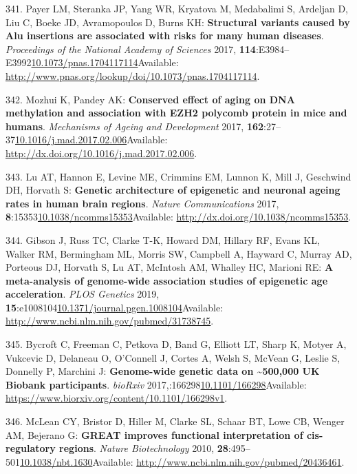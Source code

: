\documentclass[
]{book}
\begin{document}
\leavevmode\hypertarget{ref-Payer2017}{}%
341. Payer LM, Steranka JP, Yang WR, Kryatova M, Medabalimi S, Ardeljan D, Liu C, Boeke JD, Avramopoulos D, Burns KH: \textbf{Structural variants caused by Alu insertions are associated with risks for many human diseases}. \emph{Proceedings of the National Academy of Sciences} 2017, \textbf{114}:E3984--E3992\href{https://doi.org/10.1073/pnas.1704117114}{10.1073/pnas.1704117114}Available: \url{http://www.pnas.org/lookup/doi/10.1073/pnas.1704117114}.

\leavevmode\hypertarget{ref-Mozhui2017}{}%
342. Mozhui K, Pandey AK: \textbf{Conserved effect of aging on DNA methylation and association with EZH2 polycomb protein in mice and humans}. \emph{Mechanisms of Ageing and Development} 2017, \textbf{162}:27--37\href{https://doi.org/10.1016/j.mad.2017.02.006}{10.1016/j.mad.2017.02.006}Available: \url{http://dx.doi.org/10.1016/j.mad.2017.02.006}.

\leavevmode\hypertarget{ref-Lu2017}{}%
343. Lu AT, Hannon E, Levine ME, Crimmins EM, Lunnon K, Mill J, Geschwind DH, Horvath S: \textbf{Genetic architecture of epigenetic and neuronal ageing rates in human brain regions}. \emph{Nature Communications} 2017, \textbf{8}:15353\href{https://doi.org/10.1038/ncomms15353}{10.1038/ncomms15353}Available: \url{http://dx.doi.org/10.1038/ncomms15353}.

\leavevmode\hypertarget{ref-Gibson2019}{}%
344. Gibson J, Russ TC, Clarke T-K, Howard DM, Hillary RF, Evans KL, Walker RM, Bermingham ML, Morris SW, Campbell A, Hayward C, Murray AD, Porteous DJ, Horvath S, Lu AT, McIntosh AM, Whalley HC, Marioni RE: \textbf{A meta-analysis of genome-wide association studies of epigenetic age acceleration}. \emph{PLOS Genetics} 2019, \textbf{15}:e1008104\href{https://doi.org/10.1371/journal.pgen.1008104}{10.1371/journal.pgen.1008104}Available: \url{http://www.ncbi.nlm.nih.gov/pubmed/31738745}.

\leavevmode\hypertarget{ref-Bycroft2017}{}%
345. Bycroft C, Freeman C, Petkova D, Band G, Elliott LT, Sharp K, Motyer A, Vukcevic D, Delaneau O, O'Connell J, Cortes A, Welsh S, McVean G, Leslie S, Donnelly P, Marchini J: \textbf{Genome-wide genetic data on \textasciitilde500,000 UK Biobank participants}. \emph{bioRxiv} 2017,:166298\href{https://doi.org/10.1101/166298}{10.1101/166298}Available: \url{https://www.biorxiv.org/content/10.1101/166298v1}.

\leavevmode\hypertarget{ref-McLean2010}{}%
346. McLean CY, Bristor D, Hiller M, Clarke SL, Schaar BT, Lowe CB, Wenger AM, Bejerano G: \textbf{GREAT improves functional interpretation of cis-regulatory regions}. \emph{Nature Biotechnology} 2010, \textbf{28}:495--501\href{https://doi.org/10.1038/nbt.1630}{10.1038/nbt.1630}Available: \url{http://www.ncbi.nlm.nih.gov/pubmed/20436461}.
\end{document}
